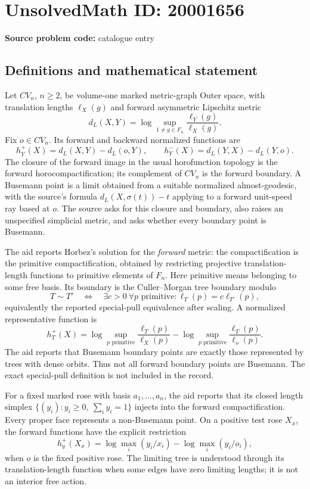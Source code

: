 \documentclass[11pt]{article}
\begin{document}
\section*{UnsolvedMath ID: 20001656}
\textbf{Source problem code:} catalogue entry
\subsection{Definitions and mathematical statement}
Let \(CV_n\), \(n\geq2\), be volume-one marked metric-graph Outer space, with translation lengths \(\ell_X(g)\) and forward asymmetric Lipschitz metric
\[
 d_L(X,Y)=\log\sup_{1\ne g\in F_n}\frac{\ell_Y(g)}{\ell_X(g)}.
\]
Fix \(o\in CV_n\). Its forward and backward normalized functions are
\[
 h_Y^+(X)=d_L(X,Y)-d_L(o,Y),\qquad
 h_Y^-(X)=d_L(Y,X)-d_L(Y,o).
\]
The closure of the forward image in the usual horofunction topology is the forward horocompactification; its complement of \(CV_n\) is the forward boundary. A Busemann point is a limit obtained from a suitable normalized almost-geodesic, with the source's formula \(d_L(X,\sigma(t))-t\) applying to a forward unit-speed ray based at \(o\). The source asks for this closure and boundary, also raises an unspecified simplicial metric, and asks whether every boundary point is Busemann.

The aid reports Horbez's solution for the \emph{forward} metric: the compactification is the primitive compactification, obtained by restricting projective translation-length functions to primitive elements of \(F_n\). Here primitive means belonging to some free basis. Its boundary is the Culler--Morgan tree boundary modulo
\[
 T\sim T'\quad\Longleftrightarrow\quad
 \exists c>0\ \forall p\text{ primitive}:\ell_T(p)=c\ell_{T'}(p),
\]
equivalently the reported special-pull equivalence after scaling. A normalized representative function is
\[
 h_T^+(X)=\log\sup_{p\text{ primitive}}\frac{\ell_T(p)}{\ell_X(p)}
 -\log\sup_{p\text{ primitive}}\frac{\ell_T(p)}{\ell_o(p)}.
\]
The aid reports that Busemann boundary points are exactly those represented by trees with dense orbits. Thus not all forward boundary points are Busemann. The exact special-pull definition is not included in the record.

For a fixed marked rose with basis \(a_1,\ldots,a_n\), the aid reports that its closed length simplex
\(\{(y_i):y_i\geq0,\ \sum_i y_i=1\}\)
injects into the forward compactification. Every proper face represents a non-Busemann point. On a positive test rose \(X_x\), the forward functions have the explicit restriction
\[
 h_y^+(X_x)=\log\max_i(y_i/x_i)-\log\max_i(y_i/o_i),
\]
when \(o\) is the fixed positive rose. The limiting tree is understood through its translation-length function when some edges have zero limiting lengths; it is not an interior free action.
\end{document}
